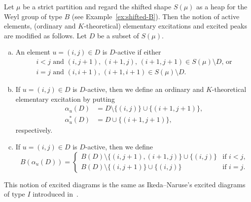\documentclass[ALCO,ThmDefs,Unicode,epreuves]{cedram}
\begin{document}
\begin{exam}
\label{ex:shited-B-excited}
Let $\mu$ be a strict partition and regard the shifted shape $S(\mu)$ as a heap for the Weyl group of type $B$ 
(see Example~\ref{ex:shifted-B}).
Then the notion of active elements, (ordinary and $K$-theoretical) elementary excitations and excited peaks 
are modified as follows.
Let $D$ be a subset of $S(\mu)$.
\begin{enumerate}[(a)]
\item\label{exam3.19_a} %
An element $u = (i,j) \in D$ is $D$-active if either
\begin{gather*}
\text{$i < j$ and $(i,j+1)$, $(i+1,j)$, $(i+1,j+1) \in S(\mu) \setminus D$, or}
\\
\text{$i = j$ and $(i,i+1)$, $(i+1,i+1) \in S(\mu) \setminus D$.}
\end{gather*}
\item\label{exam3.19_b} %
If $u = (i,j) \in D$ is $D$-active, then we define an ordinary and $K$-theoretical 
elementary excitation by putting
\begin{align*}
\alpha_u(D) &= D \setminus \{ (i,j) \} \cup \{ (i+1,j+1) \},
\\
\alpha^*_u(D) &= D \cup \{ (i+1,j+1) \},
\end{align*}
respectively.
\item\label{exam3.19_c} %
If $u = (i,j) \in D$ is $D$-active, then we define
$$
B(\alpha_u(D))
 =
\begin{cases}
 B(D) \setminus \{ (i,j+1), (i+1,j) \} \cup \{ (i,j) \} 
 &\text{if $i<j$,}
\\
 B(D) \setminus \{ (i,j+1) \} \cup \{ (i,j) \} 
 &\text{if $i=j$.}
\end{cases}
$$
\end{enumerate}
This notion of excited diagrams is the same as Ikeda--Naruse's excited diagrams of type $I$ 
introduced in~\cite{IN1}.


\end{exam}
\end{document}
